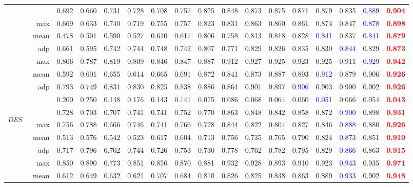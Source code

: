 \documentclass[journal]{IEEEtran}
\newcommand{\trb}[1]{\textbf{\textcolor{red}{#1}}}
\newcommand{\tbb}[1]{\textcolor{blue}{#1}}
\newcommand{\DES}{\textit{DES}~\cite{cheng2014depth}}
\begin{document}
\begin{table*}[t!]
\begin{tabular}{lr|ccccc|ccccccccc|c}
		&     & 0.692 & 0.660 & 0.731 & 0.728 & 0.708 & 0.757 & 0.825 & 0.848 & 0.873 & 0.875 & 0.871 & 0.879 & 0.835 & \tbb{0.889} & \trb{0.904} \\
		& max     & 0.669 & 0.633 & 0.740 & 0.719 & 0.755 & 0.757 & 0.823 & 0.831 & 0.863 & 0.860 & 0.861 & 0.874 & 0.847 & \tbb{0.878} & \trb{0.898} \\
		& mean      & 0.478 & 0.501 & 0.590 & 0.527 & 0.610 & 0.617 & 0.806 & 0.758 & 0.813 & 0.818 & 0.828 & \tbb{0.841} & 0.837 & \tbb{0.841} & \trb{0.879} \\
		& adp      & 0.661 & 0.595 & 0.742 & 0.744 & 0.748 & 0.742 & 0.807 & 0.771 & 0.829 & 0.826 & 0.835 & 0.830  & \tbb{0.844} & 0.829 & \trb{0.873} \\
		& max       & 0.806 & 0.787 & 0.819 & 0.809 & 0.846 & 0.847 & 0.887 & 0.912 & 0.927 & 0.925 & 0.923 & 0.925 & 0.911 & \tbb{0.929} & \trb{0.942} \\
		& mean      & 0.592 & 0.601 & 0.655 & 0.614 & 0.665 & 0.691 & 0.872 & 0.841 & 0.873 & 0.887 & 0.893 & \tbb{0.912} & 0.879 & 0.906 & \trb{0.926} \\
		& adp      & 0.793 & 0.749 & 0.831 & 0.830 & 0.825 & 0.838 & 0.886 & 0.864 & 0.901 & 0.897 & \tbb{0.906} & 0.903 & 0.900 & 0.902 & \trb{0.926} \\
		&  & 0.200 & 0.250 & 0.148 & 0.176 & 0.143 & 0.141 & 0.075 & 0.086 & 0.068 & 0.064 & 0.060 & \tbb{0.051} & 0.066 & 0.054 & \trb{0.043} \\
		\midrule
		\multirow{8}{*}{\begin{sideways}\DES\end{sideways}}
		&     & 0.728 & 0.703 & 0.707 & 0.741 & 0.741 & 0.752 & 0.770 & 0.863 & 0.848 & 0.842 & 0.858 & 0.872 & \tbb{0.900} & 0.898 & \trb{0.931} \\
		& max      & 0.756 & 0.788 & 0.666 & 0.746 & 0.741 & 0.766 & 0.728 & 0.844 & 0.822 & 0.804 & 0.827 & 0.846 & \tbb{0.888} & 0.880 & \trb{0.926} \\
		& mean      & 0.513 & 0.576 & 0.542 & 0.523 & 0.617 & 0.604 & 0.713 & 0.756 & 0.735 & 0.765 & 0.790 & 0.824 & \tbb{0.873} & 0.851 & \trb{0.910} \\
		& adp      & 0.717 & 0.796 & 0.702 & 0.744 & 0.726 & 0.753 & 0.730 & 0.778 & 0.762 & 0.782 & 0.795 & 0.829 & \tbb{0.866} & 0.863 & \trb{0.915} \\
		& max        & 0.850 & 0.890 & 0.773 & 0.851 & 0.856 & 0.870 & 0.881 & 0.932 & 0.928 & 0.893 & 0.910 & 0.923 & \tbb{0.943} & 0.935 & \trb{0.971} \\
		& mean      & 0.612 & 0.649 & 0.632 & 0.621 & 0.707 & 0.684 & 0.810 & 0.826 & 0.825 & 0.838 & 0.863 & 0.889 & \tbb{0.933} & 0.902 & \trb{0.948} \\

\end{tabular}
\end{table*}
\end{document}
